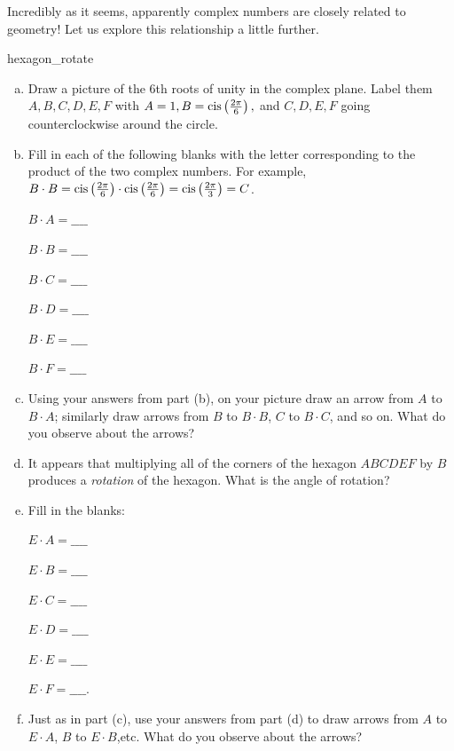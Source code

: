 {Incredibly as it seems, apparently complex numbers are closely related to geometry! Let us explore this relationship a little further.

\begin{exercise}{hexagon_rotate}
\begin{enumerate}[(a)]
\item
Draw a picture of the  6th roots of unity in the complex plane. Label them $A,B,C,D,E,F$ with $A=1, B= \operatorname{cis}\left(\frac{2\pi}{6}\right),$ and $C,D,E,F$ going counterclockwise around the circle.
\item
Fill in each of the following blanks with the letter corresponding to the product of the two complex numbers. For example,  $B \cdot B = \operatorname{cis}\left(\frac{2\pi}{6}\right) \cdot \operatorname{cis}\left(\frac{2\pi}{6}\right) = \operatorname{cis}\left(\frac{2\pi}{3}\right) = C$.
\begin{multicols}{3}
$B \cdot A = \_\_\_\_$

$B \cdot B = \_\_\_\_$ 

$B \cdot C = \_\_\_\_$

$B \cdot D = \_\_\_\_$

$B \cdot E = \_\_\_\_$ 

$B \cdot F = \_\_\_\_$
\end{multicols}

\item
Using your answers from part (b), on your picture draw an arrow from $A$ to $B \cdot A$; similarly draw arrows from $B$ to $B \cdot B$, $C$ to $B \cdot C$, and so on. What do you observe about the arrows?
\item
It appears that multiplying all of the corners of the hexagon $ABCDEF$ by $B$ produces a \emph{rotation} of the hexagon. What is the angle of rotation?
\item
Fill in the blanks:
\begin{multicols}{3}
$E \cdot A = \_\_\_\_$

 $E \cdot B = \_\_\_\_$

 $E \cdot C = \_\_\_\_$

$E \cdot D = \_\_\_\_$


$E \cdot E = \_\_\_\_$

 $E \cdot F = \_\_\_\_$.

\end{multicols}

\item Just as in part (c), use your answers from part (d) to draw arrows from $A$ to $E \cdot A$, $B$ to $E \cdot B$,etc. What do you observe about the arrows? 


\end{enumerate}
\end{exercise}}

